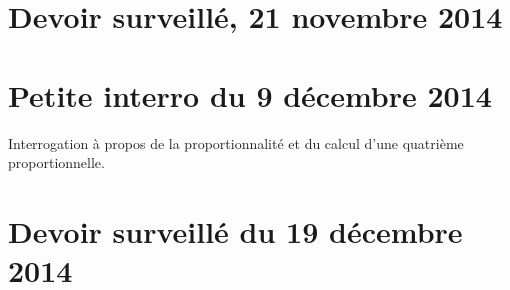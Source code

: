 
\section{Devoir surveillé, 21 novembre 2014}


\section{Petite interro du 9 décembre 2014}

Interrogation à propos de la proportionnalité et du calcul d'une quatrième proportionnelle.


\section{Devoir surveillé du 19 décembre 2014}


